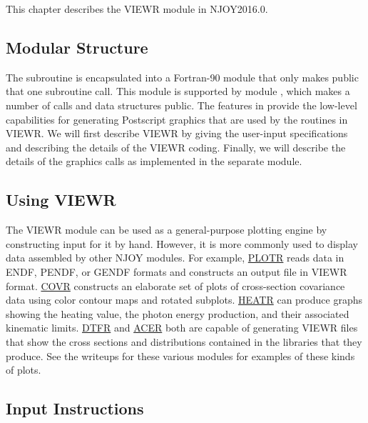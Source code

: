 This chapter describes the VIEWR module in NJOY2016.0.

\subsection{Modular Structure}
\label{ssVIEWR_mod}

The 
subroutine is encapsulated into a Fortran-90 module
that only makes public that one subroutine call.  This module is
supported by module ,
which makes a number of calls and data structures public.  The
features in  provide the low-level capabilities for
generating Postscript graphics that are used by the routines
in VIEWR.  We will first describe VIEWR by giving the user-input
specifications and describing the details of the VIEWR coding.
 Finally, we will describe the details of the graphics
calls as implemented in the separate  module.

\subsection{Using VIEWR}
\label{ssVIEWR_using}

The VIEWR module can be used as a general-purpose plotting engine by
constructing input for it by hand.  However, it is more commonly used
to display data assembled by other NJOY modules.  For example,
\hyperlink{sPLOTRhy}{PLOTR} reads data
in ENDF, PENDF, or
GENDF formats and constructs an output file in VIEWR
format.  \hyperlink{sCOVRhy}{COVR} constructs
an elaborate set of plots of
cross-section covariance data using color contour maps and rotated
subplots.  \hyperlink{sHEATRhy}{HEATR} can
produce graphs showing the heating
value, the photon energy production, and their associated kinematic
limits.   \hyperlink{sDTFRhy}{DTFR} and
\hyperlink{sACERhy}{ACER} both are capable of
generating VIEWR files that show the cross sections and distributions
contained in the libraries that they produce.  See the writeups for
these various modules for examples of these kinds of plots.


\subsection{Input Instructions}
\label{ssVIEWR_inp}

